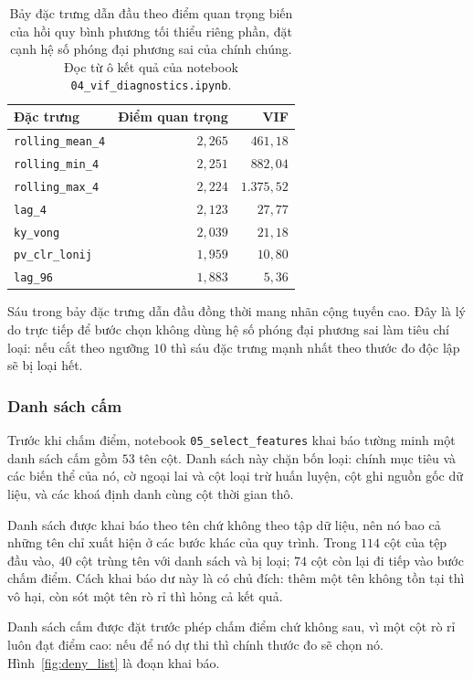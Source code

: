 \documentclass[12pt, a4paper]{report}
\begin{document}
\begin{table}[htbp]
\centering
\caption{Bảy đặc trưng dẫn đầu theo điểm quan trọng biến của hồi quy bình phương tối thiểu riêng
phần, đặt cạnh hệ số phóng đại phương sai của chính chúng. Đọc từ ô kết quả của notebook
\texttt{04\_vif\_diagnostics.ipynb}.}
\label{tab:pls}
\small
\begin{tabular}{l r r}
\toprule
\textbf{Đặc trưng} & \textbf{Điểm quan trọng} & \textbf{VIF} \\
\midrule
\texttt{rolling\_mean\_4} & $2{,}265$ & $461{,}18$ \\
\texttt{rolling\_min\_4}  & $2{,}251$ & $882{,}04$ \\
\texttt{rolling\_max\_4}  & $2{,}224$ & $1.375{,}52$ \\
\texttt{lag\_4}          & $2{,}123$ & $27{,}77$ \\
\texttt{ky\_vong}        & $2{,}039$ & $21{,}18$ \\
\texttt{pv\_clr\_lonij}   & $1{,}959$ & $10{,}80$ \\
\texttt{lag\_96}         & $1{,}883$ & $5{,}36$ \\
\bottomrule
\end{tabular}
\end{table}

Sáu trong bảy đặc trưng dẫn đầu đồng thời mang nhãn cộng tuyến cao. Đây là lý do trực tiếp để
bước chọn không dùng hệ số phóng đại phương sai làm tiêu chí loại: nếu cắt theo ngưỡng $10$ thì
sáu đặc trưng mạnh nhất theo thước đo độc lập sẽ bị loại hết.

\subsubsection{Danh sách cấm}

Trước khi chấm điểm, notebook \texttt{05\_select\_features} khai báo tường minh một danh sách cấm
gồm $53$ tên cột. Danh sách này chặn bốn loại: chính mục tiêu và các biến thể của nó, cờ ngoại
lai và cột loại trừ huấn luyện, cột ghi nguồn gốc dữ liệu, và các khoá định danh cùng cột thời
gian thô.

Danh sách được khai báo theo tên chứ không theo tập dữ liệu, nên nó bao cả những tên chỉ xuất
hiện ở các bước khác của quy trình. Trong $114$ cột của tệp đầu vào, $40$ cột trùng tên với
danh sách và bị loại; $74$ cột còn lại đi tiếp vào bước chấm điểm. Cách khai báo dư này là có
chủ đích: thêm một tên không tồn tại thì vô hại, còn sót một tên rò rỉ thì hỏng cả kết quả.

Danh sách cấm được đặt trước phép chấm điểm chứ không sau, vì một cột rò rỉ luôn đạt điểm cao:
nếu để nó dự thi thì chính thước đo sẽ chọn nó. Hình~\ref{fig:deny_list} là đoạn khai báo.
\end{document}
